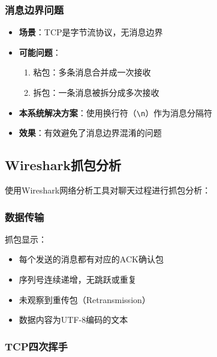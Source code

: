 \documentclass[12pt, a4paper]{article}
\newcommand{\cmd}[1]{\texttt{#1}}
\begin{document}
\subsubsection{消息边界问题}

\begin{itemize}[itemsep=3pt]
  \item \textbf{场景}：TCP是字节流协议，无消息边界
  \item \textbf{可能问题}：
  \begin{enumerate}[itemsep=2pt]
    \item 粘包：多条消息合并成一次接收
    \item 拆包：一条消息被拆分成多次接收
  \end{enumerate}
  \item \textbf{本系统解决方案}：使用换行符（\cmd{\textbackslash n}）作为消息分隔符
  \item \textbf{效果}：有效避免了消息边界混淆的问题
\end{itemize}

\subsection{Wireshark抓包分析}

使用Wireshark网络分析工具对聊天过程进行抓包分析：


\subsubsection{数据传输}

抓包显示：

\begin{itemize}[itemsep=3pt]
  \item 每个发送的消息都有对应的ACK确认包
  \item 序列号连续递增，无跳跃或重复
  \item 未观察到重传包（Retransmission）
  \item 数据内容为UTF-8编码的文本
\end{itemize}

\subsubsection{TCP四次挥手}
\end{document}

